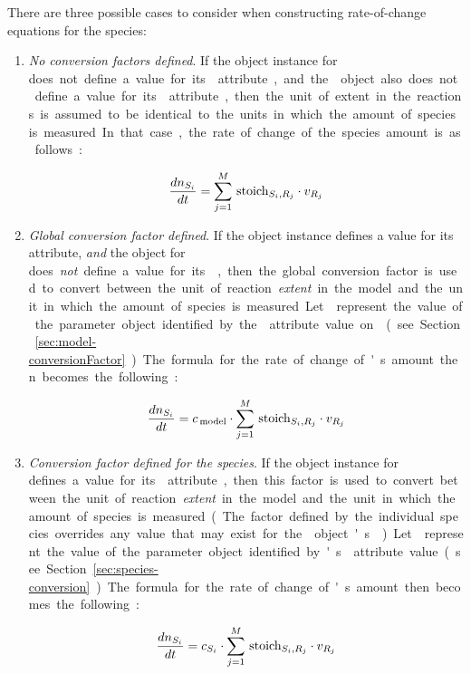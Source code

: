 There are three possible cases to consider when constructing
rate-of-change equations for the species:
\begin{enumerate}\setlength{\parskip}{-0.2ex}

\item \emph{No conversion factors defined}.  If the \Species
  object instance for \si does not define a value for its
   attribute, and the \Model object also
  does not define a value for its 
  attribute, then the unit of extent in the reactions is assumed
  to be identical to the units in which the amount of species \si
  is measured.  In that case, the rate of change of the species
  amount is as follows:
  \begin{linenomath}
    \begin{equation*}
      \frac{d n_{S_i}}{dt} = \sum_{j=1}^{M} \, \textrm{stoich}_{S_{i},R_{j}} \cdot v_{R_j} 
    \end{equation*}
  \end{linenomath}

\item \emph{Global conversion factor defined}.  If the \Model
  object instance defines a value for its 
  attribute, \emph{and} the \Species object for \si does
  \emph{not} define a value for its , then
  the global conversion factor is used to convert between the unit
  of reaction \emph{extent} in the model and the unit in which the
  amount of species \si is measured.  Let \csg represent the value
  of the parameter object identified by the
   attribute value on \Model (see
  Section~\ref{sec:model-conversionFactor}).  The formula for the
  rate of change of \si's amount then becomes the following:
  \begin{linenomath}
    \begin{equation*}
      \frac{d n_{S_i}}{dt} = c_{\,\textrm{model}} \cdot \sum_{j=1}^{M} \, \textrm{stoich}_{S_{i},R_{j}} \cdot v_{R_j} 
    \end{equation*}
  \end{linenomath}

\item \emph{Conversion factor defined for the species}.  If the
  \Species object instance for \si defines a value for its
   attribute, then this factor is used to
  convert between the unit of reaction \emph{extent} in the model
  and the unit in which the amount of species \si is measured.
  (The factor defined by the individual species overrides any
  value that may exist for the \Model object's
  .)  Let \csi represent the value of the
  parameter object identified by \si's 
  attribute value (see Section~\ref{sec:species-conversion}).  The
  formula for the rate of change of \si's amount then becomes the
  following:
  \begin{linenomath}
    \begin{equation*}
      \frac{d n_{S_i}}{dt} = c_{S_i} \cdot \sum_{j=1}^{M} \, \textrm{stoich}_{S_{i},R_{j}} \cdot v_{R_j} 
    \end{equation*}
  \end{linenomath}

\end{enumerate}
